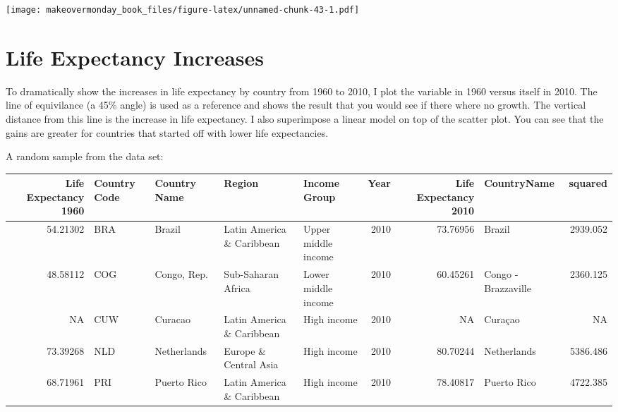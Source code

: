 \documentclass[]{book}
\theoremstyle{definition}
\theoremstyle{definition}
\theoremstyle{definition}
\theoremstyle{remark}
\begin{document}
\texttt{[image: makeovermonday\_book\_files/figure-latex/unnamed-chunk-43-1.pdf]}

\chapter{Life Expectancy Increases}\label{life-expectancy-increases}

To dramatically show the increases in life expectancy by country from
1960 to 2010, I plot the variable in 1960 versus itself in 2010. The
line of equivilance (a 45\% angle) is used as a reference and shows the
result that you would see if there where no growth. The vertical
distance from this line is the increase in life expectancy. I also
superimpose a linear model on top of the scatter plot. You can see that
the gains are greater for countries that started off with lower life
expectancies.

A random sample from the data set:

\begin{tabular}{r|l|l|l|l|r|r|l|r}
\hline
Life Expectancy 1960 & Country Code & Country Name & Region & Income Group & Year & Life Expectancy 2010 & CountryName & squared\\
\hline
54.21302 & BRA & Brazil & Latin America \& Caribbean & Upper middle income & 2010 & 73.76956 & Brazil & 2939.052\\
\hline
48.58112 & COG & Congo, Rep. & Sub-Saharan Africa & Lower middle income & 2010 & 60.45261 & Congo - Brazzaville & 2360.125\\
\hline
NA & CUW & Curacao & Latin America \& Caribbean & High income & 2010 & NA & Curaçao & NA\\
\hline
73.39268 & NLD & Netherlands & Europe \& Central Asia & High income & 2010 & 80.70244 & Netherlands & 5386.486\\
\hline
68.71961 & PRI & Puerto Rico & Latin America \& Caribbean & High income & 2010 & 78.40817 & Puerto Rico & 4722.385\\
\hline
\end{tabular}
\end{document}
